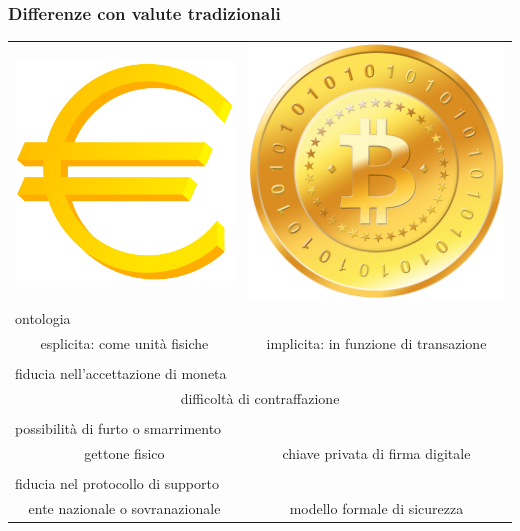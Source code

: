 \begin{frame}
	\frametitle{Differenze con valute tradizionali}
	
\begin{table}[h]
\begin{tabular}{ll}
	\multicolumn{1}{c}{\includegraphics[width = 1 cm]{images/euro.png}} &
	\multicolumn{1}{c}{\includegraphics[width = 1 cm]{images/bitcoin.png}} 											  \\
	
	\multicolumn{2}{l}{{\color{blue}ontologia}}                                                               \\
	\multicolumn{1}{c}{esplicita: come unità fisiche} &
	\multicolumn{1}{c}{implicita: in funzione di transazione}															  \\ \hline \\
	
	\multicolumn{2}{l}{{\color{blue}fiducia nell'accettazione di moneta}}                                             \\
	\multicolumn{2}{c}{difficoltà di contraffazione}                                                                  \\ \hline \\
	
	\multicolumn{2}{l}{{\color{blue}possibilità di furto o smarrimento}}			\\
	\multicolumn{1}{c}{gettone fisico} & \multicolumn{1}{c}{chiave privata di firma digitale}                         \\ \hline \\
	\multicolumn{2}{l}{{\color{blue}fiducia nel protocollo di supporto}}                                              \\
	\multicolumn{1}{c}{ente nazionale o sovranazionale} & \multicolumn{1}{c}{modello formale di sicurezza}            \\
	\end{tabular}
\end{table}

\end{frame}